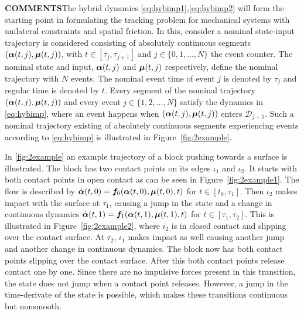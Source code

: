 \documentclass[../DC2017114Bouma.tex]{subfiles}
\begin{document}
\textbf{COMMENTS}The hybrid dynamics \eqref{eq:hybimp1},\eqref{eq:hybimp2} will form the starting point in formulating the tracking problem for mechanical systems with unilateral constraints and spatial friction. In this, consider a nominal state-input trajectory is considered consisting of absolutely continuous segments $(\boldsymbol{\alpha}(t,j),\boldsymbol{\mu}(t,j))$, with $t\in\left[\tau_j,\tau_{j+1}\right]$ and $j\in\{0,1,...,N\}$ the event counter. The nominal state and input, $\boldsymbol{\alpha}(t,j)$ and $\boldsymbol{\mu}(t,j)$ respectively, define the nominal trajectory with $N$ events. The nominal event time of event $j$ is denoted by $\tau_j$ and regular time is denoted by $t$. Every segment of the nominal trajectory $(\boldsymbol{\alpha}(t,j),\boldsymbol{\mu}(t,j))$ and every event $j\in\{1,2,...,N\}$ satisfy the dynamics in \eqref{eq:hybimp}, where an event happens when $(\boldsymbol{\alpha}(t,j),\boldsymbol{\mu}(t,j))$ enters $\mathcal{D}_{j+1}$. Such a nominal trajectory existing of absolutely continuous segments experiencing events according to \eqref{eq:hybimp} is illustrated in Figure~\ref{fig:2example}.

In \ref{fig:2example} an example trajectory of a block pushing towards a surface is illustrated. The block has two contact points on its edges $\iota_1$ and $\iota_2$. It starts with both contact points in open contact as can be seen in Figure~\ref{fig:2example1}. The flow is described by $\dot{\boldsymbol{\alpha}}(t,0) = {\boldsymbol{f}}_0(\boldsymbol{\alpha}(t,0),\boldsymbol{\mu}(t,0),t)$ for $t\in[t_0,\tau_1]$. Then $\iota_2$ makes impact with the surface at $\tau_1$, causing a jump in the state and a change in continuous dynamics $\dot{\boldsymbol{\alpha}}(t,1) = {\boldsymbol{f}}_1(\boldsymbol{\alpha}(t,1),\boldsymbol{\mu}(t,1),t)$ for $t\in[\tau_1,\tau_2]$. This is illustrated in Figure~\ref{fig:2example2}, where $i_2$ is in closed contact and slipping over the contact surface. At $\tau_2$, $\iota_1$ makes impact as well causing another jump and another change in continuous dynamics. The block now has both contact points slipping over the contact surface. After this both contact points release contact one by one. Since there are no impulsive forces present in this transition, the state does not jump when a contact point releases. However, a jump in the time-derivate of the state is possible, which makes these transitions continuous but nonsmooth.
\end{document}
